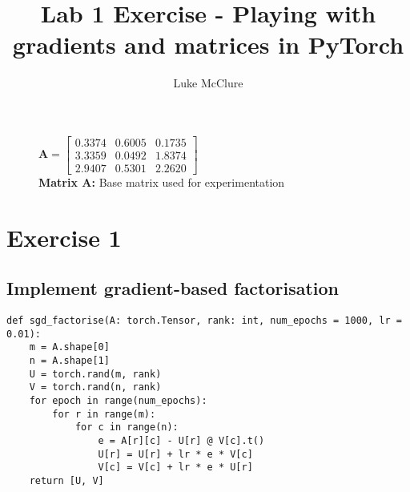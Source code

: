 \documentclass[sigconf]{acmart}
\begin{document}
\title{Lab 1 Exercise - Playing with gradients and matrices in PyTorch}
\author{Luke McClure}

\maketitle
\pagestyle{myheadings}
\begin{figure}[h]
    \centering
    $\mathbf{A} = \begin{bmatrix}
        0.3374 & 0.6005 & 0.1735 \\
        3.3359 & 0.0492 & 1.8374 \\
        2.9407 & 0.5301 & 2.2620
    \end{bmatrix} $ \\
    \hypertarget{mat:A}{\textbf{Matrix A:} Base matrix used for experimentation}
\end{figure}
\section{Exercise 1}
\subsection{Implement gradient-based factorisation}
\begin{listing}[H]
    \begin{verbatim}
def sgd_factorise(A: torch.Tensor, rank: int, num_epochs = 1000, lr = 0.01):
    m = A.shape[0]
    n = A.shape[1]
    U = torch.rand(m, rank)
    V = torch.rand(n, rank)
    for epoch in range(num_epochs):
        for r in range(m):
            for c in range(n):
                e = A[r][c] - U[r] @ V[c].t()
                U[r] = U[r] + lr * e * V[c] 
                V[c] = V[c] + lr * e * U[r]
    return [U, V]
    \end{verbatim}
\end{listing}
\end{document}
